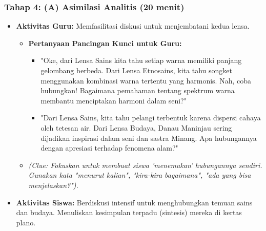 \documentclass[12pt,a4paper]{article}
\begin{document}
\subsubsection{Tahap 4: (A) Asimilasi Analitis (20 menit)}
\begin{itemize}
\item \textbf{Aktivitas Guru:} Memfasilitasi diskusi untuk menjembatani kedua lensa.
    \begin{itemize}
    \item \textbf{Pertanyaan Pancingan Kunci untuk Guru:}
        \begin{itemize}
        \item "Oke, dari Lensa Sains kita tahu setiap warna memiliki panjang gelombang berbeda. Dari Lensa Etnosains, kita tahu songket menggunakan kombinasi warna tertentu yang harmonis. Nah, coba hubungkan! Bagaimana pemahaman tentang spektrum warna membantu menciptakan harmoni dalam seni?"
        \item "Dari Lensa Sains, kita tahu pelangi terbentuk karena dispersi cahaya oleh tetesan air. Dari Lensa Budaya, Danau Maninjau sering dijadikan inspirasi dalam seni dan sastra Minang. Apa hubungannya dengan apresiasi terhadap fenomena alam?"
        \end{itemize}
    \item \textit{(Clue: Fokuskan untuk membuat siswa 'menemukan' hubungannya sendiri. Gunakan kata "menurut kalian", "kira-kira bagaimana", "ada yang bisa menjelaskan?").}
    \end{itemize}
\item \textbf{Aktivitas Siswa:} Berdiskusi intensif untuk menghubungkan temuan sains dan budaya. Menuliskan kesimpulan terpadu (sintesis) mereka di kertas plano.
\end{itemize}
\end{document}
